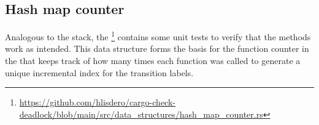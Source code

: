 \subsection{Hash map counter}

Analogous to the stack,
the \footnote{\url{https://github.com/hlisdero/cargo-check-deadlock/blob/main/src/data_structures/hash_map_counter.rs}}
contains some unit tests to verify that the methods work as intended.
This data structure forms the basis for the function counter in the 
that keeps track of how many times each function was called
to generate a unique incremental index for the transition labels.
